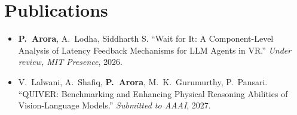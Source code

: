 \documentclass[11pt,letterpaper]{article}
\begin{document}
\section*{Publications}
\vspace{-0.5ex}
 
%
 
\begin{itemize}
    \item \textbf{P.\ Arora}, A.\ Lodha, Siddharth S. ``Wait for It: A Component-Level Analysis of Latency Feedback Mechanisms for LLM Agents in VR.'' \textit{Under review, MIT Presence}, 2026.
    \item V.\ Lalwani, A.\ Shafiq, \textbf{P.\ Arora}, M.\ K.\ Gurumurthy, P.\ Pansari. ``QUIVER: Benchmarking and Enhancing Physical Reasoning Abilities of Vision-Language Models.'' \textit{Submitted to AAAI}, 2027.
\end{itemize}
 
\end{document}
